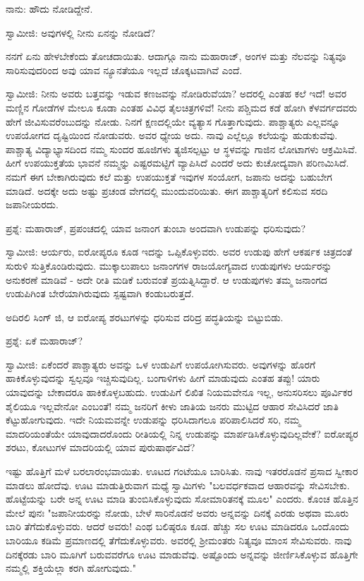 ನಾನು: ಹೌದು ನೋಡಿದ್ದೇನೆ.

ಸ್ವಾಮೀಜಿ: ಅವುಗಳಲ್ಲಿ ನೀನು ಏನನ್ನು ನೋಡಿದೆ?

ನನಗೆ ಏನು ಹೇಳಬೇಕೆಂದು ತೋಚದಾಯಿತು. ಆದಾಗ್ಗೂ ನಾನು ಮಹಾರಾಜ್, ಅಂಗಳ ಮತ್ತು ನೆಲವನ್ನು ನಿತ್ಯವೂ ಸಾರಿಸುವುದರಿಂದ ಅವು ಯಾವ ನ್ಯೂನತೆಯೂ ಇಲ್ಲದೆ ಚೊಕ್ಕಟವಾಗಿವೆ ಎಂದೆ.

ಸ್ವಾಮೀಜಿ: ನೀನು ಅವರು ಬತ್ತವನ್ನು ಇಡುವ ಕಣಜವನ್ನು ನೋಡಿರುವೆಯಾ? ಅದರಲ್ಲಿ ಎಂತಹ ಕಲೆ ಇದೆ! ಅವರ ಮಣ್ಣಿನ ಗೋಡೆಗಳ ಮೇಲೂ ಕೂಡಾ ಎಂತಹ ವಿವಿಧ ತೈಲಚಿತ್ರಗಳಿವೆ! ನೀನು ಪಶ್ಚಿಮದ ಕಡೆ ಹೋಗಿ ಕೆಳವರ್ಗದವರು ಹೇಗೆ ಜೀವಿಸುವರೆಂಬುದನ್ನು ನೋಡು. ನಿನಗೆ ಕ್ಷಣದಲ್ಲಿಯೇ ವ್ಯತ್ಯಾಸ ಗೊತ್ತಾಗುವುದು. ಪಾಶ್ಚಾತ್ಯರು ಎಲ್ಲವನ್ನೂ ಉಪಯೋಗದ ದೃಷ್ಟಿಯಿಂದ ನೋಡುವರು. ಅವರ ಧ್ಯೇಯ ಅದು. ನಾವು ಎಲ್ಲೆಲ್ಲೂ ಕಲೆಯನ್ನು ಹುಡುಕುವೆವು. ಪಾಶ್ಚಾತ್ಯ ವಿದ್ಯಾಭ್ಯಾಸದಿಂದ ನಮ್ಮ ಸುಂದರ ಹೂಜಿಗಳು ತ್ಯಜಿಸಲ್ಪಟ್ಟು ಆ ಸ್ಥಳವನ್ನು ಗಾಜಿನ ಲೋಟಾಗಳು ಆಕ್ರಮಿಸಿವೆ. ಹೀಗೆ ಉಪಯುಕ್ತತೆಯ ಭಾವನೆ ನಮ್ಮನ್ನು ಎಷ್ಟರಮಟ್ಟಿಗೆ ವ್ಯಾಪಿಸಿದೆ ಎಂದರೆ ಅದು ಕುಚೋದ್ಯವಾಗಿ ಪರಿಣಮಿಸಿದೆ. ನಮಗೆ ಈಗ ಬೇಕಾಗಿರುವುದು ಕಲೆ ಮತ್ತು ಉಪಯುಕ್ತತೆ ಇವುಗಳ ಸಂಯೋಗ, ಜಪಾನು ಅದನ್ನು ಬಹುಬೇಗ ಮಾಡಿದೆ. ಅದಕ್ಕೇ ಅದು ಅಷ್ಟು ಪ್ರಚಂಡ ವೇಗದಲ್ಲಿ ಮುಂದುವರಿಯಿತು. ಈಗ ಪಾಶ್ಚಾತ್ಯರಿಗೆ ಕಲಿಸುವ ಸರದಿ ಜಪಾನೀಯರದು.

ಪ್ರಶ್ನೆ: ಮಹಾರಾಜ್, ಪ್ರಪಂಚದಲ್ಲಿ ಯಾವ ಜನಾಂಗ ತುಂಬಾ ಅಂದವಾಗಿ ಉಡುಪನ್ನು ಧರಿಸುವುದು?

ಸ್ವಾಮೀಜಿ: ಆರ್ಯರು, ಐರೋಪ್ಯರೂ ಕೂಡ ಇದನ್ನು ಒಪ್ಪಿಕೊಳ್ಳುವರು. ಅವರ ಉಡುಪು ಹೇಗೆ ಆಕರ್ಷಕ ಚಿತ್ರದಂತೆ ಸುರುಳಿ ಸುತ್ತಿಕೊಂಡಿರುವುದು. ಮುಕ್ಕಾಲುಪಾಲು ಜನಾಂಗಗಳ ರಾಜಯೋಗ್ಯವಾದ ಉಡುಪುಗಳು ಆರ್ಯರನ್ನು ಅನುಕರಣೆ ಮಾಡಿವೆ - ಅದೇ ರೀತಿ ಮಡಿಕೆ ಬರುವಂತೆ ಪ್ರಯತ್ನಿಸಿದ್ದಾರೆ. ಆ ಉಡುಪುಗಳು ತಮ್ಮ ಜನಾಂಗದ ಉಡುಪಿಗಿಂತ ಬೇರೆಯಾಗಿರುವುದು ಸ್ಪಷ್ಟವಾಗಿ ಕಂಡುಬರುತ್ತದೆ.

ಅದಿರಲಿ ಸಿಂಗ್ ಜಿ, ಆ ಐರೋಪ್ಯ ಶರಟುಗಳನ್ನು ಧರಿಸುವ ದರಿದ್ರ ಪದ್ಧತಿಯನ್ನು ಬಿಟ್ಟುಬಿಡು.

ಪ್ರಶ್ನೆ: ಏಕೆ ಮಹಾರಾಜ್?

ಸ್ವಾಮೀಜಿ: ಏಕೆಂದರೆ ಪಾಶ್ಚಾತ್ಯರು ಅವನ್ನು ಒಳ ಉಡುಪಿಗೆ ಉಪಯೋಗಿಸುವರು. ಅವುಗಳನ್ನು ಹೊರಗೆ ಹಾಕಿಕೊಳ್ಳುವುದನ್ನು ಸ್ವಲ್ಪವೂ ಇಚ್ಚಿಸುವುದಿಲ್ಲ. ಬಂಗಾಳಿಗಳು ಹೀಗೆ ಮಾಡುವುದು ಎಂತಹ ತಪ್ಪು! ಯಾರು ಯಾವುದನ್ನು ಬೇಕಾದರೂ ಹಾಕಿಕೊಳ್ಳಬಹುದು. ಉಡುಪಿಗೆ ಲಿಖಿತ ನಿಯಮವೇನೂ ಇಲ್ಲ, ಅನುಸರಿಸಲು ಪೂರ್ವಿಕರ ಶೈಲಿಯೂ ಇಲ್ಲವೇನೋ ಎಂಬಂತೆ! ನಮ್ಮ ಜನರಿಗೆ ಕೀಳು ಜಾತಿಯ ಜನರು ಮುಟ್ಟಿದ ಆಹಾರ ಸೇವಿಸಿದರೆ ಜಾತಿ ಕೆಟ್ಟುಹೋಗುವುದು. ಇದೇ ನಿಯಮವನ್ನೇ ಉಡುಪನ್ನು ಧರಿಸಿದಾಗಲೂ ಪರಿಪಾಲಿಸಿದರೆ ಸರಿ, ನಮ್ಮ ಮಾದರಿಯಂತೆಯೇ ಯಾವುದಾದರೊಂದು ರೀತಿಯಲ್ಲಿ ನಿನ್ನ ಉಡುಪನ್ನು ಮಾರ್ಪಡಿಸಿಕೊಳ್ಳುವುದಿಲ್ಲವೇಕೆ? ಐರೋಪ್ಯರ ಶರಟು, ಕೋಟುಗಳ ಮಾದರಿಯಲ್ಲಿ ಯಾವ ಪುರುಷಾರ್ಥವಿದೆ?

ಇಷ್ಟು ಹೊತ್ತಿಗೆ ಮಳೆ ಬರಲಾರಂಭವಾಯಿತು. ಊಟದ ಗಂಟೆಯೂ ಬಾರಿಸಿತು. ನಾವು ಇತರರೊಡನೆ ಪ್ರಸಾದ ಸ್ವೀಕಾರ ಮಾಡಲು ಹೋದೆವು. ಊಟ ಮಾಡುತ್ತಿರುವಾಗ ಮಧ್ಯೆ ಸ್ವಾಮಿಗಳು "ಬಲವರ್ಧಕವಾದ ಆಹಾರವನ್ನು ಸೇವಿಸಬೇಕು. ಹೊಟ್ಟೆಯನ್ನು ಬರೇ ಅನ್ನ ಊಟ ಮಾಡಿ ತುಂಬಿಸಿಕೊಳ್ಳುವುದು ಸೋಮಾರಿತನಕ್ಕೆ ಮೂಲ" ಎಂದರು. ಕೊಂಚ ಹೊತ್ತಿನ ಮೇಲೆ ಪುನಃ "ಜಪಾನೀಯರನ್ನು ನೋಡು, ಬೇಳೆ ಸಾರಿನೊಡನೆ ಅವರು ಅನ್ನವನ್ನು ದಿನಕ್ಕೆ ಎರಡು ಅಥವಾ ಮೂರು ಬಾರಿ ತೆಗೆದುಕೊಳ್ಳುವರು. ಆದರೆ ಅವರು! ಎಂಥ ಬಲಿಷ್ಠರೂ ಕೂಡ. ಹೆಚ್ಚು ಸಲ ಊಟ ಮಾಡಿದರೂ ಒಂದೊಂದು ಬಾರಿಯೂ ಕಡಿಮೆ ಪ್ರಮಾಣದಲ್ಲಿ ತೆಗೆದುಕೊಳ್ಳುವರು. ಅವರಲ್ಲಿ ಶ‍್ರೀಮಂತರು ನಿತ್ಯವೂ ಮಾಂಸ ಸೇವಿಸುವರು. ನಾವು ದಿನಕ್ಕೆರಡು ಬಾರಿ ಮೂಗಿಗೆ ಬರುವವರೆಗೂ ಊಟ ಮಾಡುವೆವು. ಅಷ್ಟೊಂದು ಅನ್ನವನ್ನು ಜೀರ್ಣಿಸಿಕೊಳ್ಳುವ ಹೊತ್ತಿಗೇ ನಮ್ಮಲ್ಲಿ ಶಕ್ತಿಯೆಲ್ಲಾ ಕರಗಿ ಹೋಗುವುದು."

